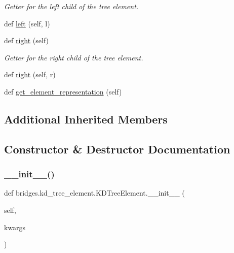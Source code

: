 \begin{DoxyCompactItemize}
\begin{DoxyCompactList}\small\item\em Getter for the left child of the tree element. \end{DoxyCompactList}\item 
def \hyperlink{classbridges_1_1kd__tree__element_1_1_k_d_tree_element_a784bad6511dae3a7c769672d2d3af14f}{left} (self, l)
\item 
def \hyperlink{classbridges_1_1kd__tree__element_1_1_k_d_tree_element_acbcfa46ba613daaf922d8b632b795a86}{right} (self)
\begin{DoxyCompactList}\small\item\em Getter for the right child of the tree element. \end{DoxyCompactList}\item 
def \hyperlink{classbridges_1_1kd__tree__element_1_1_k_d_tree_element_a89071f192bee403a44f92c86a5fdc49d}{right} (self, r)
\item 
def \hyperlink{classbridges_1_1kd__tree__element_1_1_k_d_tree_element_a4e08a6f2e4ff70be2b0dfd6eacdcf10e}{get\+\_\+element\+\_\+representation} (self)
\end{DoxyCompactItemize}
\subsection*{Additional Inherited Members}


\subsection{Constructor \& Destructor Documentation}
\mbox{\label{classbridges_1_1kd__tree__element_1_1_k_d_tree_element_adf6832855ce0ca7dfe126362a704cf70}} 
\subsubsection{\texorpdfstring{\+\_\+\+\_\+init\+\_\+\+\_\+()}{\_\_init\_\_()}}
{\footnotesize\ttfamily def bridges.\+kd\+\_\+tree\+\_\+element.\+K\+D\+Tree\+Element.\+\_\+\+\_\+init\+\_\+\+\_\+ (\begin{DoxyParamCaption}\item[{}]{self,  }\item[{}]{kwargs }\end{DoxyParamCaption})}



